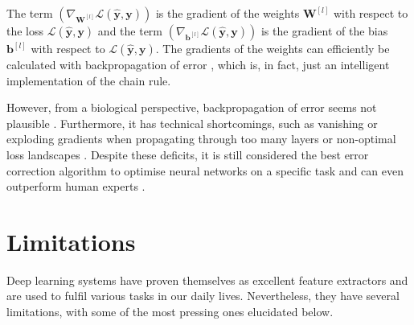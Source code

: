 %
The term $\left( \nabla_{\boldsymbol{W}^{[l]}} \mathcal{L}(\boldsymbol{\hat{y}}, \boldsymbol{y}) \right)$ is the gradient of the weights $\boldsymbol{W}^{[l]}$  with respect to the loss $\mathcal{L}(\boldsymbol{\hat{y}}, \boldsymbol{y})$ and the term $\left( \nabla_{\boldsymbol{b}^{[l]}} \mathcal{L}(\boldsymbol{\hat{y}}, \boldsymbol{y}) \right)$ is the gradient of the bias \(\boldsymbol{b}^{[l]}\)  with respect to $\mathcal{L}(\boldsymbol{\hat{y}}, \boldsymbol{y})$.
The gradients of the weights can efficiently be calculated with backpropagation of error , which is, in fact, just an intelligent implementation of the chain rule.

However, from a biological perspective, backpropagation of error seems not plausible .
Furthermore, it has technical shortcomings, such as vanishing or exploding gradients when propagating through too many layers  or non-optimal loss landscapes .
Despite these deficits, it is still considered the best error correction algorithm to optimise neural networks on a specific task and can even outperform human experts .

\section{Limitations}
Deep learning systems have proven themselves as excellent feature extractors and are used to fulfil various tasks in our daily lives.
Nevertheless, they have several limitations, with some of the most pressing ones elucidated below.

